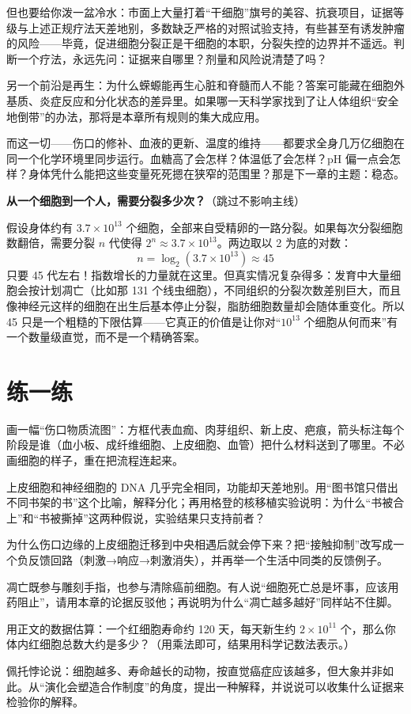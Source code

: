 但也要给你泼一盆冷水：市面上大量打着“干细胞”旗号的美容、抗衰项目，证据等级与上述正规疗法天差地别，多数缺乏严格的对照试验支持，有些甚至有诱发肿瘤的风险——毕竟，促进细胞分裂正是干细胞的本职，分裂失控的边界并不遥远。判断一个疗法，永远先问：证据来自哪里？剂量和风险说清楚了吗？

另一个前沿是再生：为什么蝾螈能再生心脏和脊髓而人不能？答案可能藏在细胞外基质、炎症反应和分化状态的差异里。如果哪一天科学家找到了让人体组织“安全地倒带”的办法，那将是本章所有规则的集大成应用。

而这一切——伤口的修补、血液的更新、温度的维持——都要求全身几万亿细胞在同一个化学环境里同步运行。血糖高了会怎样？体温低了会怎样？pH 偏一点会怎样？身体凭什么能把这些变量死死摁在狭窄的范围里？那是下一章的主题：稳态。

\begin{tiaozhan}
\textbf{从一个细胞到一个人，需要分裂多少次？}（跳过不影响主线）

假设身体约有 $3.7\times 10^{13}$ 个细胞，全部来自受精卵的一路分裂。如果每次分裂细胞数翻倍，需要分裂 $n$ 代使得 $2^n \approx 3.7\times 10^{13}$。两边取以 2 为底的对数：
\[
n = \log_2(3.7\times 10^{13}) \approx 45
\]
只要 45 代左右！指数增长的力量就在这里。但真实情况复杂得多：发育中大量细胞会按计划凋亡（比如那 131 个线虫细胞），不同组织的分裂次数差别巨大，而且像神经元这样的细胞在出生后基本停止分裂，脂肪细胞数量却会随体重变化。所以 45 只是一个粗糙的下限估算——它真正的价值是让你对“$10^{13}$ 个细胞从何而来”有一个数量级直觉，而不是一个精确答案。
\end{tiaozhan}

\section*{练一练}

\begin{sikaoti}
\item 画一幅“伤口物质流图”：方框代表血痂、肉芽组织、新上皮、疤痕，箭头标注每个阶段是谁（血小板、成纤维细胞、上皮细胞、血管）把什么材料送到了哪里。不必画细胞的样子，重在把流程连起来。
\item 上皮细胞和神经细胞的 DNA 几乎完全相同，功能却天差地别。用“图书馆只借出不同书架的书”这个比喻，解释分化；再用格登的核移植实验说明：为什么“书被合上”和“书被撕掉”这两种假说，实验结果只支持前者？
\item 为什么伤口边缘的上皮细胞迁移到中央相遇后就会停下来？把“接触抑制”改写成一个负反馈回路（刺激→响应→刺激消失），并再举一个生活中同类的反馈例子。
\item 凋亡既参与雕刻手指，也参与清除癌前细胞。有人说“细胞死亡总是坏事，应该用药阻止”，请用本章的论据反驳他；再说明为什么“凋亡越多越好”同样站不住脚。
\item 用正文的数据估算：一个红细胞寿命约 120 天，每天新生约 $2\times 10^{11}$ 个，那么你体内红细胞总数大约是多少？（用乘法即可，结果用科学记数法表示。）
\item 佩托悖论说：细胞越多、寿命越长的动物，按直觉癌症应该越多，但大象并非如此。从“演化会塑造合作制度”的角度，提出一种解释，并说说可以收集什么证据来检验你的解释。
\end{sikaoti}

